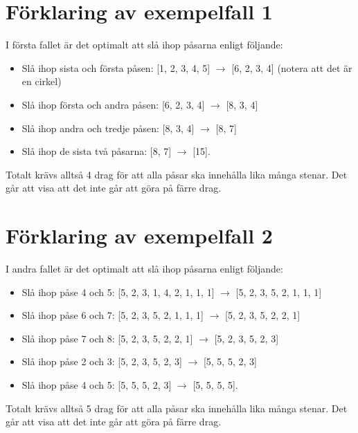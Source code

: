 \section*{Förklaring av exempelfall 1}
I första fallet är det optimalt att slå ihop påsarna enligt följande:
\begin{itemize}
    \item Slå ihop sista och första påsen: [1, 2, 3, 4, 5] $\to$ [6, 2, 3, 4] (notera att det är en cirkel)
    \item Slå ihop första och andra påsen: [6, 2, 3, 4] $\to$ [8, 3, 4]
    \item Slå ihop andra och tredje påsen: [8, 3, 4] $\to$ [8, 7]
    \item Slå ihop de sista två påsarna: [8, 7] $\to$ [15].
\end{itemize}

Totalt krävs alltså 4 drag för att alla påsar ska innehålla lika många stenar. Det går att visa att det inte går att göra på färre drag.


\section*{Förklaring av exempelfall 2}

I andra fallet är det optimalt att slå ihop påsarna enligt följande:
\begin{itemize}
    \item Slå ihop påse 4 och 5: [5, 2, 3, 1, 4, 2, 1, 1, 1] $\to$ [5, 2, 3, 5, 2, 1, 1, 1]
    \item Slå ihop påse 6 och 7: [5, 2, 3, 5, 2, 1, 1, 1] $\to$ [5, 2, 3, 5, 2, 2, 1]
    \item Slå ihop påse 7 och 8: [5, 2, 3, 5, 2, 2, 1] $\to$ [5, 2, 3, 5, 2, 3]
    \item Slå ihop påse 2 och 3: [5, 2, 3, 5, 2, 3] $\to$ [5, 5, 5, 2, 3]
    \item Slå ihop påse 4 och 5: [5, 5, 5, 2, 3] $\to$ [5, 5, 5, 5].
\end{itemize}
Totalt krävs alltså 5 drag för att alla påsar ska innehålla lika många stenar. Det går att visa att det inte går att göra på färre drag.

